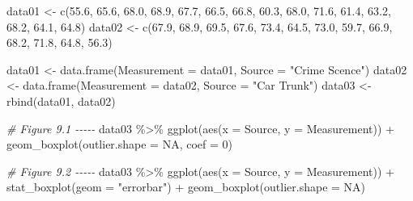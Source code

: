 \documentclass[
]{book}
\newenvironment{Shaded}{\begin{snugshade}}{\end{snugshade}}
\newcommand{\AttributeTok}[1]{\textcolor[rgb]{0.77,0.63,0.00}{#1}}
\newcommand{\CommentTok}[1]{\textcolor[rgb]{0.56,0.35,0.01}{\textit{#1}}}
\newcommand{\ConstantTok}[1]{\textcolor[rgb]{0.00,0.00,0.00}{#1}}
\newcommand{\DecValTok}[1]{\textcolor[rgb]{0.00,0.00,0.81}{#1}}
\newcommand{\FloatTok}[1]{\textcolor[rgb]{0.00,0.00,0.81}{#1}}
\newcommand{\FunctionTok}[1]{\textcolor[rgb]{0.00,0.00,0.00}{#1}}
\newcommand{\NormalTok}[1]{#1}
\newcommand{\OtherTok}[1]{\textcolor[rgb]{0.56,0.35,0.01}{#1}}
\newcommand{\SpecialCharTok}[1]{\textcolor[rgb]{0.00,0.00,0.00}{#1}}
\newcommand{\StringTok}[1]{\textcolor[rgb]{0.31,0.60,0.02}{#1}}
\begin{document}
\begin{Shaded}
\begin{Highlighting}[]
\NormalTok{data01 }\OtherTok{\textless{}{-}} \FunctionTok{c}\NormalTok{(}\FloatTok{55.6}\NormalTok{, }\FloatTok{65.6}\NormalTok{, }\FloatTok{68.0}\NormalTok{, }\FloatTok{68.9}\NormalTok{, }\FloatTok{67.7}\NormalTok{, }\FloatTok{66.5}\NormalTok{, }\FloatTok{66.8}\NormalTok{, }\FloatTok{60.3}\NormalTok{, }\FloatTok{68.0}\NormalTok{, }\FloatTok{71.6}\NormalTok{, }\FloatTok{61.4}\NormalTok{, }\FloatTok{63.2}\NormalTok{, }\FloatTok{68.2}\NormalTok{, }\FloatTok{64.1}\NormalTok{, }\FloatTok{64.8}\NormalTok{)}
\NormalTok{data02 }\OtherTok{\textless{}{-}} \FunctionTok{c}\NormalTok{(}\FloatTok{67.9}\NormalTok{, }\FloatTok{68.9}\NormalTok{, }\FloatTok{69.5}\NormalTok{, }\FloatTok{67.6}\NormalTok{, }\FloatTok{73.4}\NormalTok{, }\FloatTok{64.5}\NormalTok{, }\FloatTok{73.0}\NormalTok{, }\FloatTok{59.7}\NormalTok{, }\FloatTok{66.9}\NormalTok{, }\FloatTok{68.2}\NormalTok{, }\FloatTok{71.8}\NormalTok{, }\FloatTok{64.8}\NormalTok{, }\FloatTok{56.3}\NormalTok{)}

\NormalTok{data01 }\OtherTok{\textless{}{-}} \FunctionTok{data.frame}\NormalTok{(}\AttributeTok{Measurement =}\NormalTok{ data01, }\AttributeTok{Source =} \StringTok{"Crime Scence"}\NormalTok{)}
\NormalTok{data02 }\OtherTok{\textless{}{-}} \FunctionTok{data.frame}\NormalTok{(}\AttributeTok{Measurement =}\NormalTok{ data02, }\AttributeTok{Source =} \StringTok{"Car Trunk"}\NormalTok{)}
\NormalTok{data03 }\OtherTok{\textless{}{-}} \FunctionTok{rbind}\NormalTok{(data01, data02)}

\CommentTok{\# Figure 9.1 {-}{-}{-}{-}{-}}
\NormalTok{data03 }\SpecialCharTok{\%\textgreater{}\%} \FunctionTok{ggplot}\NormalTok{(}\FunctionTok{aes}\NormalTok{(}\AttributeTok{x =}\NormalTok{ Source, }\AttributeTok{y =}\NormalTok{ Measurement)) }\SpecialCharTok{+}
  \FunctionTok{geom\_boxplot}\NormalTok{(}\AttributeTok{outlier.shape =} \ConstantTok{NA}\NormalTok{, }\AttributeTok{coef =} \DecValTok{0}\NormalTok{)}

\CommentTok{\# Figure 9.2 {-}{-}{-}{-}{-}}
\NormalTok{data03 }\SpecialCharTok{\%\textgreater{}\%} \FunctionTok{ggplot}\NormalTok{(}\FunctionTok{aes}\NormalTok{(}\AttributeTok{x =}\NormalTok{ Source, }\AttributeTok{y =}\NormalTok{ Measurement)) }\SpecialCharTok{+} \FunctionTok{stat\_boxplot}\NormalTok{(}\AttributeTok{geom =} \StringTok{"errorbar"}\NormalTok{) }\SpecialCharTok{+} 
  \FunctionTok{geom\_boxplot}\NormalTok{(}\AttributeTok{outlier.shape =} \ConstantTok{NA}\NormalTok{)}


\end{Highlighting}
\end{Shaded}
\end{document}
